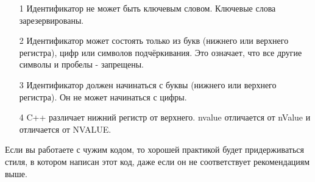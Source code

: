\documentclass[a4paper,16pt]{report} %
\begin{document}
\begin{itemize}
	\item[1]Идентификатор не может быть ключевым словом. Ключевые слова зарезервированы.
	\item[2]Идентификатор может состоять только из букв (нижнего или верхнего регистра), цифр или символов подчёркивания. Это означает, что все другие символы и пробелы - запрещены.
	\item[3]Идентификатор должен начинаться с буквы (нижнего или верхнего регистра). Он не может начинаться с цифры.
	\item[4]C++ различает нижний регистр от верхнего. nvalue отличается от nValue и отличается от NVALUE.
\end{itemize}

Если вы работаете с чужим кодом, то хорошей практикой будет придерживаться стиля, в котором написан этот код, даже если он не соответствует рекомендациям выше.
\end{document}

